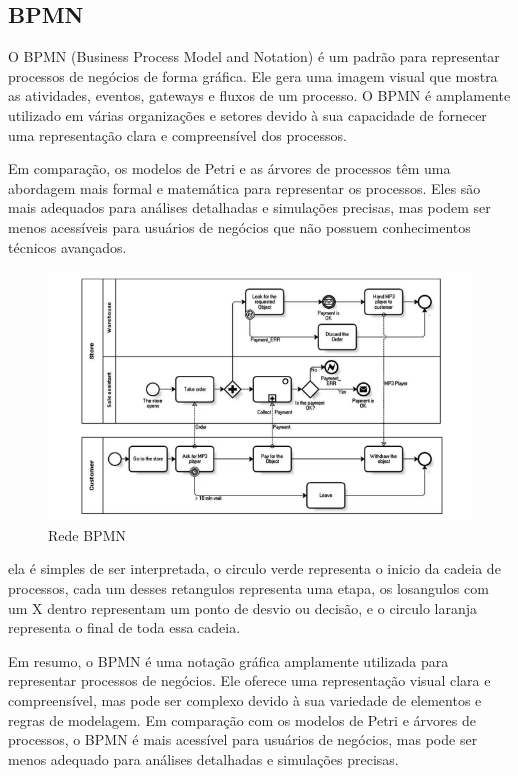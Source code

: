 \documentclass[tcc2]{classe_uftex/uftex}
\begin{document}
\subsection{BPMN}

O BPMN (Business Process Model and Notation) é um padrão para representar processos de negócios de forma gráfica. Ele gera uma imagem visual que mostra as atividades, eventos, gateways e fluxos de um processo. O BPMN é amplamente utilizado em várias organizações e setores devido à sua capacidade de fornecer uma representação clara e compreensível dos processos.\cite{chinosi2012bpmn}

Em comparação, os modelos de Petri e as árvores de processos têm uma abordagem mais formal e matemática para representar os processos. Eles são mais adequados para análises detalhadas e simulações precisas, mas podem ser menos acessíveis para usuários de negócios que não possuem conhecimentos técnicos avançados.

\begin{figure}[h]
    \centering
    \includegraphics[width=12cm]{tcc_example/bpmn.png}
    \caption{Rede BPMN\cite{chinosi2012bpmn}}
\end{figure}

ela é simples de ser interpretada, o circulo verde representa o inicio da cadeia de processos, cada um desses retangulos representa uma etapa, os losangulos com um X dentro representam um ponto de desvio ou decisão, e o circulo laranja representa o final de toda essa cadeia.

Em resumo, o BPMN é uma notação gráfica amplamente utilizada para representar processos de negócios. Ele oferece uma representação visual clara e compreensível, mas pode ser complexo devido à sua variedade de elementos e regras de modelagem. Em comparação com os modelos de Petri e árvores de processos, o BPMN é mais acessível para usuários de negócios, mas pode ser menos adequado para análises detalhadas e simulações precisas.
\end{document}
